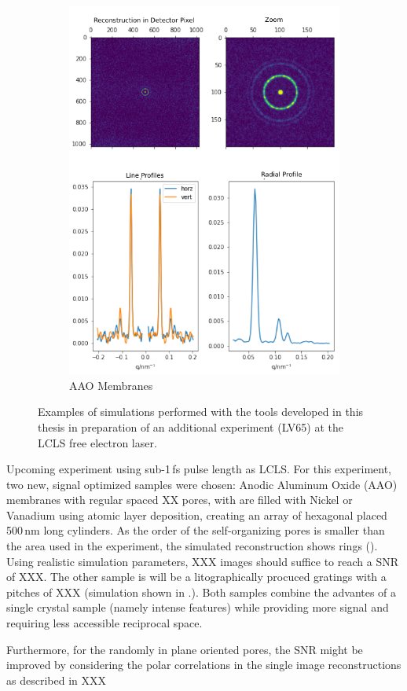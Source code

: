 \begin{figure}
\begin{subfigure}[b]{0.37\textwidth}
	\includegraphics[width=\linewidth]{images/lv65simB.pdf}
	\caption{AAO Membranes}
	\label{fig:outlook_aao}
\end{subfigure}
\caption[Simulations in Preparation of LV65 Experiment]{Examples of simulations performed with the tools developed in this thesis in preparation of an additional experiment (LV65) at the LCLS free electron laser.}
\end{figure}

Upcoming experiment using sub-1\,fs pulse length as LCLS. 
For this experiment, two new, signal optimized samples were chosen: Anodic Aluminum Oxide (AAO) membranes with regular spaced XX pores, with are filled with Nickel or Vanadium using atomic layer deposition, creating an array of hexagonal placed  500\,nm long cylinders. As the order of the self-organizing pores is smaller than the area used in the experiment, the simulated reconstruction shows rings (). Using realistic simulation parameters, XXX images should suffice to reach a SNR of XXX.
The other sample is will be a litographically procuced gratings with a pitches of XXX (simulation shown in .). Both samples combine the advantes of a single crystal sample (namely intense features) while providing more signal and requiring less accessible reciprocal space. 


Furthermore, for the randomly in plane oriented pores, the SNR might be improved by considering the polar correlations in the single image reconstructions as described in XXX


